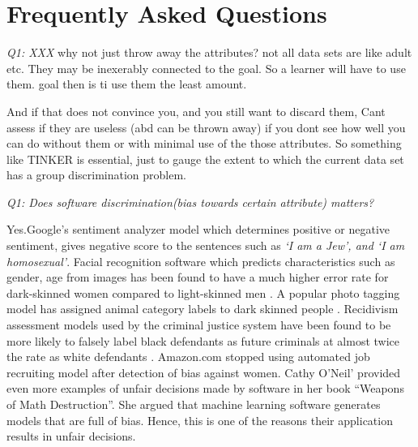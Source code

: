  





\section{Frequently Asked Questions}\label{tion:faq}
{\em Q1: XXX}
 why not just throw away the attributes? not all data sets are like adult etc. They may be inexerably
 connected to the goal. So a learner will have to use them. goal then is ti use them the least amount.
 
And if that does not convince you, and you still want to discard them, Cant assess if they are useless (abd can be thrown away) if you dont see how well you can do without them or with minimal use of the those attributes. So something like TINKER is essential, just to gauge the extent to which the current data set has a group discrimination problem.

{\em Q1: Does software discrimination(bias towards certain attribute) matters?}

Yes.Google's sentiment analyzer model which determines positive or negative sentiment, gives negative score to the sentences such as \textit{`I am a Jew', and `I am homosexual'}\cite{Google_Sentiment}. Facial recognition software which predicts characteristics such as gender, age from images has been found to have a much higher error rate for dark-skinned women compared to light-skinned men \cite{Gender_Bias}. A popular photo tagging model has assigned animal category labels to dark skinned people \cite{Google_Photo}. Recidivism assessment models used by the criminal justice system have been found to be more likely to falsely label black defendants as future criminals at almost twice the rate as white defendants \cite{Machine_Bias}. Amazon.com stopped using automated job recruiting model after detection of bias against women\cite{Amazon_Bias}. Cathy O'Neil’ provided even more examples of unfair decisions made by software in her book ``Weapons of Math Destruction''\cite{O'Neil:2016:WMD:3002861}. She argued that machine learning software generates models that are full of bias. Hence, this is one of the reasons their application results in unfair decisions.

